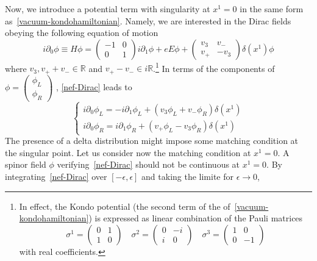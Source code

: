 Now, we introduce a potential term with singularity at $x^1 = 0$ in the same form as~\cref{vacuum-kondohamiltonian}.
Namely, we are interested in the Dirac fields obeying the following equation of motion
\begin{equation}\label{nef-Dirac}
i \partial_0 \phi \equiv H\phi =
\begin{pmatrix} 
-1 & 0 \\
0 & 1 
\end{pmatrix} i \partial_1 \phi 
+ eE\phi
+
\begin{pmatrix}
v_3 & v_- \\
v_+ & -v_3
\end{pmatrix} \delta(x^1) \phi
\end{equation}
where $v_3, v_+ + v_- \in \mathbb{R}$ and $ v_+ - v_-\in i \mathbb{R}$.\footnote{
In effect, the Kondo potential (the second term of the \rhs of~\cref{vacuum-kondohamiltonian}) is expressed as linear combination of the Pauli matrices
\begin{equation*}
\sigma^1 = \begin{pmatrix} 0 & 1 \\ 1 & 0 \end{pmatrix} \quad
\sigma^2 = \begin{pmatrix} 0 & -i \\ i & 0 \end{pmatrix} \quad
\sigma^3 = \begin{pmatrix} 1 & 0 \\ 0 & -1 \end{pmatrix} 
\end{equation*}
with real coefficients.
}
In terms of the components of $\phi =
\begin{pmatrix}
\phi_L \\
\phi_R
\end{pmatrix}$
, \cref{nef-Dirac} leads to
\begin{equation}
\begin{cases}
i \partial_0 \phi_L = -i\partial_1 \phi_L + (v_3 \phi_L + v_- \phi_R) \delta(x^1) \\
i \partial_0 \phi_R = i\partial_1 \phi_R + (v_+ \phi_L - v_3 \phi_R) \delta(x^1)
\end{cases}
\end{equation}
The presence of a delta distribution might impose some matching condition at the singular point.
Let us consider now the matching condition at $x^1=0$.
A spinor field $\phi$ verifying~\cref{nef-Dirac} should not be continuous at $x^1 = 0$. 
By integrating~\cref{nef-Dirac} over $[-\epsilon, \epsilon]$ and taking the limite for $\epsilon \rightarrow 0$,
